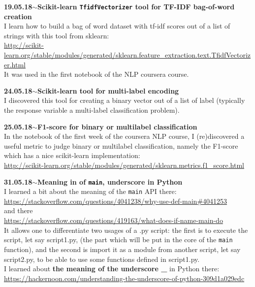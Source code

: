 \documentclass[11pt,a4paper]{article}
\newenvironment{loggentry}[2]%
{\noindent\textbf{#1}\hspace{1cm}$\mathbf{\sim}$\text{ }\textbf{#2}\\}{\vspace{0.5cm}}
\begin{document}
\begin{loggentry}{19.05.18}{Scikit-learn \texttt{TfidfVectorizer} tool for TF-IDF bag-of-word creation}
I learn how to build a bag of word dataset with tf-idf scores out of a list of strings with this tool from sklearn:\\
\url{http://scikit-learn.org/stable/modules/generated/sklearn.feature_extraction.text.TfidfVectorizer.html}\\
It was used in the first notebook of the NLP coursera course.
\end{loggentry}

\begin{loggentry}{24.05.18}{Scikit-learn tool for multi-label encoding}
I discovered this tool for creating a binary vector out of a list of label (typically the response variable a multi-label classification problem).
\end{loggentry}

\begin{loggentry}{25.05.18}{F1-score for binary or multilabel classification}
In the notebook of the first week of the coursera NLP course, I (re)discovered a useful metric to judge binary or multilabel classification, namely the F1-score which has a nice scikit-learn implementation:\\
\url{http://scikit-learn.org/stable/modules/generated/sklearn.metrics.f1_score.html}\\
\end{loggentry}

\begin{loggentry}{31.05.18}{Meaning in of \texttt{main}, underscore in Python}
I learned a bit about the meaning of the \texttt{main} API there:\\
\url{https://stackoverflow.com/questions/4041238/why-use-def-main#4041253}\\
and there\\
\url{https://stackoverflow.com/questions/419163/what-does-if-name-main-do}\\
It allows one to differentiate two usages of a .py script: the first is to execute the script, let say script1.py, (the part which will be put in the core of the \texttt{main} function), and the second is import it as a module from another script, let say script2.py, to be able to use some functions defined in script1.py.\\
I learned about \textbf{the meaning of the underscore \_} in Python there:\\
\url{https://hackernoon.com/understanding-the-underscore-of-python-309d1a029edc}
\end{loggentry}
\end{document}
